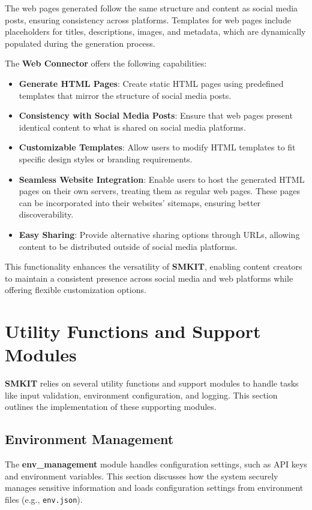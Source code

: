 The web pages generated follow the same structure and content as social media posts, ensuring consistency across platforms. Templates for web pages include placeholders for titles, descriptions, images, and metadata, which are dynamically populated during the generation process.

The \textbf{Web Connector} offers the following capabilities:
\begin{itemize}
    \item \textbf{Generate HTML Pages}: Create static HTML pages using predefined templates that mirror the structure of social media posts.
    \item \textbf{Consistency with Social Media Posts}: Ensure that web pages present identical content to what is shared on social media platforms.
    \item \textbf{Customizable Templates}: Allow users to modify HTML templates to fit specific design styles or branding requirements.
    \item \textbf{Seamless Website Integration}: Enable users to host the generated HTML pages on their own servers, treating them as regular web pages. These pages can be incorporated into their websites' sitemaps, ensuring better discoverability.
    \item \textbf{Easy Sharing}: Provide alternative sharing options through URLs, allowing content to be distributed outside of social media platforms.
\end{itemize}

This functionality enhances the versatility of \textbf{SMKIT}, enabling content creators to maintain a consistent presence across social media and web platforms while offering flexible customization options.


\section{Utility Functions and Support Modules}
\label{sec:utility_functions_and_support_modules}
\textbf{SMKIT} relies on several utility functions and support modules to handle tasks like input validation, environment configuration, and logging. This section outlines the implementation of these supporting modules.

\subsection{Environment Management}
\label{subsec:Environment_management}
The \textbf{env\_management} module handles configuration settings, such as API keys and environment variables. This section discusses how the system securely manages sensitive information and loads configuration settings from environment files (e.g., \texttt{env.json}).

